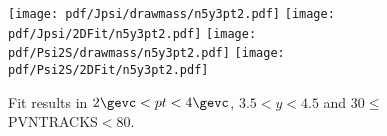\begin{figure}[H]
\begin{center}
\texttt{[image: pdf/Jpsi/drawmass/n5y3pt2.pdf]}
\texttt{[image: pdf/Jpsi/2DFit/n5y3pt2.pdf]}
\vspace*{-0.5cm}
\texttt{[image: pdf/Psi2S/drawmass/n5y3pt2.pdf]}
\texttt{[image: pdf/Psi2S/2DFit/n5y3pt2.pdf]}
\vspace*{-0.5cm}
\end{center}
\caption{Fit results in $2\gevc<pt<4\gevc$, $3.5<y<4.5$ and 30$\leq$PVNTRACKS$<$80.}
\label{Fitn5y3pt2}
\end{figure}
